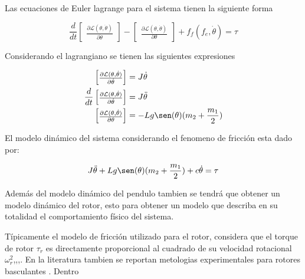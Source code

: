 \documentclass[a4paper]{IEEEtran} %
\begin{document}
Las ecuaciones de Euler lagrange para el sistema tienen la siguiente forma

\begin{equation}
    \frac{d}{dt}\begin{bmatrix}
        \frac{\partial \mathcal{L}(\theta,\dot{\theta})}{\partial\dot{\theta}}
    \end{bmatrix}-\begin{bmatrix}
        \frac{\partial \mathcal{L}(\theta,\dot{\theta})}{\partial \theta}
    \end{bmatrix}+f_f(f_e,\dot{\theta})=\tau
    \label{eq:eu_lagran}
\end{equation}

Considerando el lagrangiano se tienen las siguientes expresiones

\begin{equation}
    \begin{split}
        \begin{bmatrix}
            \frac{\partial \mathcal{L}(\theta,\dot{\theta})}{\partial\dot{\theta}}
        \end{bmatrix}&=J\dot{\theta}\\
        \frac{d}{dt}\begin{bmatrix}
            \frac{\partial\mathcal{L}(\theta,\dot{\theta})}{\partial\dot{\theta}}
        \end{bmatrix}&=J\ddot{\theta}\\
        \begin{bmatrix}
            \frac{\partial \mathcal{L}(\theta,\dot{\theta})}{\partial \theta}
        \end{bmatrix}&=-Lg\sen(\theta)(m_2 + \frac{m_1}{2})\\
    \end{split}
    \label{eq:dq}
\end{equation}

El modelo dinámico del sistema considerando el fenomeno de fricción esta dado por:

\begin{equation}
    J\ddot{\theta}+Lg\sen(\theta)(m_2+\frac{m_1}{2})+c\dot{\theta}=\tau
    \label{eq:din_model}
\end{equation}

Además del modelo dinámico del pendulo tambien se tendrá que obtener un modelo dinámico del rotor, esto para obtener un modelo que describa en su totalidad el comportamiento físico del sistema.

Típicamente el modelo de fricción utilizado para el rotor, considera que el torque de rotor $\tau_r$ es directamente proporcional al cuadrado de su velocidad rotacional $\omega^2_r$\cite{nemati2014modeling},\cite{schulz2015high},\cite{koehl2012aerodynamic},\cite{mellinger2012trajectory}. En la literatura tambien se reportan metologias experimentales para rotores basculantes \cite{gill2017propeller}. Dentro





\end{document}
